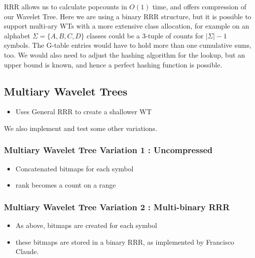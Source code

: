 RRR allows us to calculate popcounts in $O(1)$ time, and offers compression of our Wavelet Tree. Here we are using a binary RRR structure, but it is possible to support multi-ary WTs with a more extensive class allocation, for example on an alphabet $\Sigma = \{ A, B, C, D \}$ classes could be a 3-tuple of counts for $|\Sigma| - 1$ symbols. The G-table entries would have to hold more than one cumulative sums, too. We would also need to adjust the hashing algorithm for the lookup, but an upper bound is known, and hence a perfect hashing function is possible.






\subsection{Multiary Wavelet Trees}
\begin{itemize}
\item
  Uses General RRR to create a shallower WT
\end{itemize}
We also implement and test some other variations.



\subsubsection{Multiary Wavelet Tree Variation 1 : Uncompressed}
\begin{itemize}
\item
  Concatenated bitmaps for each symbol
\item
  rank becomes a count on a range
\end{itemize}



\subsubsection{Multiary Wavelet Tree Variation 2 : Multi-binary RRR}
\begin{itemize}
\item
  As above, bitmaps are created for each symbol
\item
  these bitmaps are stored in a binary RRR, as implemented by
  Francisco Claude.
\end{itemize}